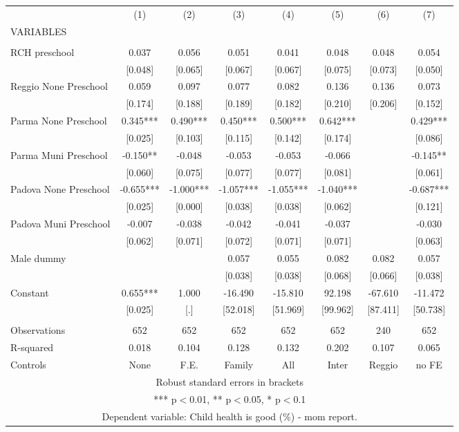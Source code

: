 \begin{tabular}{lccccccc} \hline
 & (1) & (2) & (3) & (4) & (5) & (6) & (7) \\
VARIABLES &  &  &  &  &  &  &  \\ \hline
 &  &  &  &  &  &  &  \\
RCH preschool & 0.037 & 0.056 & 0.051 & 0.041 & 0.048 & 0.048 & 0.054 \\
 & [0.048] & [0.065] & [0.067] & [0.067] & [0.075] & [0.073] & [0.050] \\
Reggio None Preschool & 0.059 & 0.097 & 0.077 & 0.082 & 0.136 & 0.136 & 0.073 \\
 & [0.174] & [0.188] & [0.189] & [0.182] & [0.210] & [0.206] & [0.152] \\
Parma None Preschool & 0.345*** & 0.490*** & 0.450*** & 0.500*** & 0.642*** &  & 0.429*** \\
 & [0.025] & [0.103] & [0.115] & [0.142] & [0.174] &  & [0.086] \\
Parma Muni Preschool & -0.150** & -0.048 & -0.053 & -0.053 & -0.066 &  & -0.145** \\
 & [0.060] & [0.075] & [0.077] & [0.077] & [0.081] &  & [0.061] \\
Padova None Preschool & -0.655*** & -1.000*** & -1.057*** & -1.055*** & -1.040*** &  & -0.687*** \\
 & [0.025] & [0.000] & [0.038] & [0.038] & [0.062] &  & [0.121] \\
Padova Muni Preschool & -0.007 & -0.038 & -0.042 & -0.041 & -0.037 &  & -0.030 \\
 & [0.062] & [0.071] & [0.072] & [0.071] & [0.071] &  & [0.063] \\
Male dummy &  &  & 0.057 & 0.055 & 0.082 & 0.082 & 0.057 \\
 &  &  & [0.038] & [0.038] & [0.068] & [0.066] & [0.038] \\
Constant & 0.655*** & 1.000 & -16.490 & -15.810 & 92.198 & -67.610 & -11.472 \\
 & [0.025] & [.] & [52.018] & [51.969] & [99.962] & [87.411] & [50.738] \\
 &  &  &  &  &  &  &  \\
Observations & 652 & 652 & 652 & 652 & 652 & 240 & 652 \\
R-squared & 0.018 & 0.104 & 0.128 & 0.132 & 0.202 & 0.107 & 0.065 \\
 Controls & None & F.E. & Family & All & Inter & Reggio & no FE \\ \hline
\multicolumn{8}{c}{ Robust standard errors in brackets} \\
\multicolumn{8}{c}{ *** p$<$0.01, ** p$<$0.05, * p$<$0.1} \\
\multicolumn{8}{c}{ Dependent variable: Child health is good (\%) - mom report.} \\
\end{tabular}
